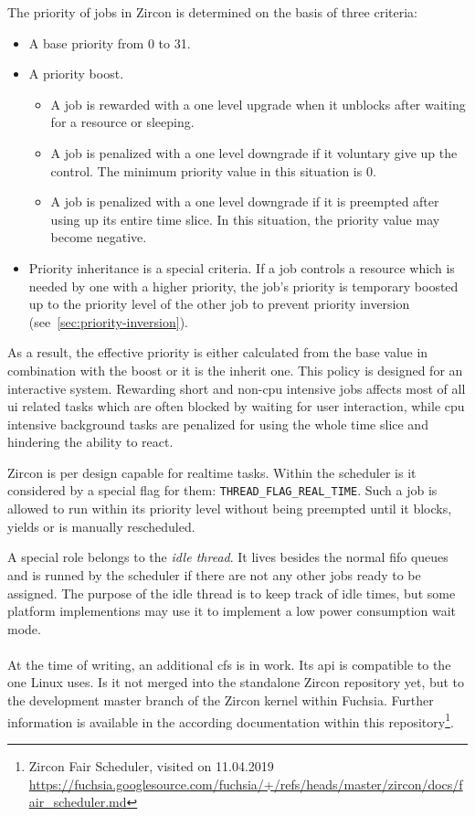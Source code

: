 The priority of jobs in Zircon is determined on the basis of three criteria:
\begin{itemize}
    \item A base priority from 0 to 31.
    \item A priority boost. 
        \begin{itemize}
            \item A job is rewarded with a one level upgrade when it unblocks after waiting for a resource or sleeping. 
            \item A job is penalized with a one level downgrade if it voluntary give up the control. The minimum priority value in this situation is 0.
            \item A job is penalized with a one level downgrade if it is preempted after using up its entire time slice. In this situation, the priority value may become negative.
        \end{itemize}
    \item Priority inheritance is a special criteria. If a job controls a resource which is needed by one with a higher priority, the job's priority is temporary boosted up to the priority level of the other job to prevent priority inversion (see~\ref{sec:priority-inversion}). 
\end{itemize}
As a result, the effective priority is either calculated from the base value in combination with the boost or it is the inherit one\cite{zircon-scheduling}.
This policy is designed for an interactive system.
Rewarding short and non-\ac{cpu} intensive jobs affects most of all \ac{ui} related tasks which are often blocked by waiting for user interaction, while \ac{cpu} intensive background tasks are penalized for using the whole time slice and hindering the ability to react.

Zircon is per design capable for realtime tasks.
Within the scheduler is it considered by a special flag for them: \texttt{THREAD\_FLAG\_REAL\_TIME}.
Such a job is allowed to run within its priority level without being preempted until it blocks, yields or is manually rescheduled\cite{zircon-scheduling}.

A special role belongs to the \textit{idle thread}.
It lives besides the normal \ac{fifo} queues and is runned by the scheduler if there are not any other jobs ready to be assigned.
The purpose of the idle thread is to keep track of idle times, but some platform implementions may use it to implement a low power consumption wait mode\cite{zircon-scheduling}.\\
\\
At the time of writing, an additional \ac{cfs} is in work.
Its \ac{api} is compatible to the one Linux uses.
Is it not merged into the standalone Zircon repository yet, but to the development master branch of the Zircon kernel within Fuchsia.
Further information is available in the according documentation within this repository\footnote{Zircon Fair Scheduler, visited on 11.04.2019 \url{https://fuchsia.googlesource.com/fuchsia/+/refs/heads/master/zircon/docs/fair_scheduler.md}}.


